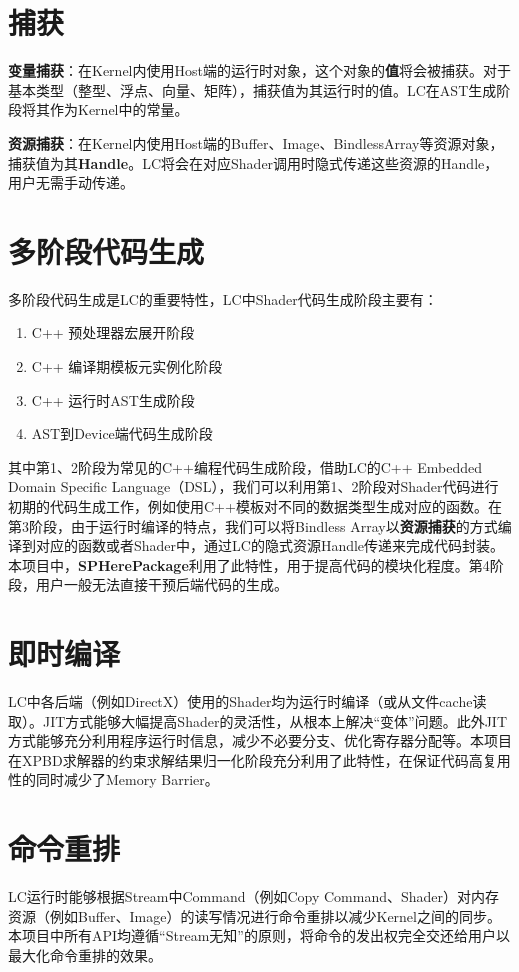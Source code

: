 \section{捕获}
\textbf{变量捕获}：在Kernel内使用Host端的运行时对象，这个对象的\textbf{值}将会被捕获。对于基本类型（整型、浮点、向量、矩阵），捕获值为其运行时的值。LC在AST生成阶段将其作为Kernel中的常量。

\textbf{资源捕获}：在Kernel内使用Host端的Buffer、Image、BindlessArray等资源对象，捕获值为其\textbf{Handle}。LC将会在对应Shader调用时隐式传递这些资源的Handle，用户无需手动传递。

\section{多阶段代码生成}
多阶段代码生成是LC的重要特性，LC中Shader代码生成阶段主要有：
\begin{enumerate}
	\item C++ 预处理器宏展开阶段
	\item C++ 编译期模板元实例化阶段
	\item C++ 运行时AST生成阶段
	\item AST到Device端代码生成阶段
\end{enumerate}
其中第1、2阶段为常见的C++编程代码生成阶段，借助LC的C++ Embedded Domain Specific Language（DSL），我们可以利用第1、2阶段对Shader代码进行初期的代码生成工作，例如使用C++模板对不同的数据类型生成对应的函数。在第3阶段，由于运行时编译的特点，我们可以将Bindless Array以\textbf{资源捕获}的方式编译到对应的函数或者Shader中，通过LC的隐式资源Handle传递来完成代码封装。本项目中，\textbf{SPHerePackage}利用了此特性，用于提高代码的模块化程度。第4阶段，用户一般无法直接干预后端代码的生成。

\section{即时编译}
LC中各后端（例如DirectX）使用的Shader均为运行时编译（或从文件cache读取）。JIT方式能够大幅提高Shader的灵活性，从根本上解决“变体”问题。此外JIT方式能够充分利用程序运行时信息，减少不必要分支、优化寄存器分配等。本项目在XPBD求解器的约束求解结果归一化阶段充分利用了此特性，在保证代码高复用性的同时减少了Memory Barrier。

\section{命令重排}
LC运行时能够根据Stream中Command（例如Copy Command、Shader）对内存资源（例如Buffer、Image）的读写情况进行命令重排以减少Kernel之间的同步。本项目中所有API均遵循“Stream无知”的原则，将命令的发出权完全交还给用户以最大化命令重排的效果。

